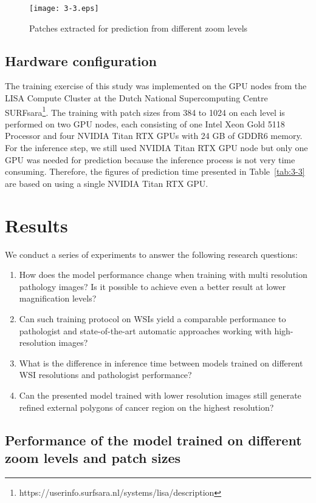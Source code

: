 \begin{figure}[!h]
\centering
\texttt{[image: 3-3.eps]}
\caption{Patches extracted for prediction from different zoom levels}
\label{fig:3-3}
\end{figure}

\subsection{Hardware configuration}\label{se:3-3.4}

The training exercise of this study was implemented on the GPU nodes from the LISA Compute Cluster at the Dutch National Supercomputing Centre SURFsara\footnote[2]{https://userinfo.surfsara.nl/systems/lisa/description}. The training with patch sizes from 384 to 1024 on each level is performed on two GPU nodes, each consisting of one Intel Xeon Gold 5118 Processor and four NVIDIA Titan RTX GPUs with 24 GB of GDDR6 memory. For the inference step, we still used NVIDIA Titan RTX GPU node but only one GPU was needed for prediction because the inference process is not very time consuming. Therefore, the figures of prediction time presented in Table~\ref{tab:3-3} are based on using a single NVIDIA Titan RTX GPU.

\section{Results}\label{se:3-4}

We conduct a series of experiments to answer the following research questions:
\begin{enumerate}
\item How does the model performance change when training with multi resolution pathology images? Is it possible to achieve even a better result at lower magnification levels?
\item Can such training protocol on WSIs yield a comparable performance to pathologist and state-of-the-art automatic approaches working with high-resolution images?
\item What is the difference in inference time between models trained on different WSI resolutions and pathologist performance?
\item Can the presented model trained with lower resolution images still generate refined external polygons of cancer region on the highest resolution?
\end{enumerate}

\subsection{Performance of the model trained on different zoom levels and patch sizes}\label{se:3-4.1}

